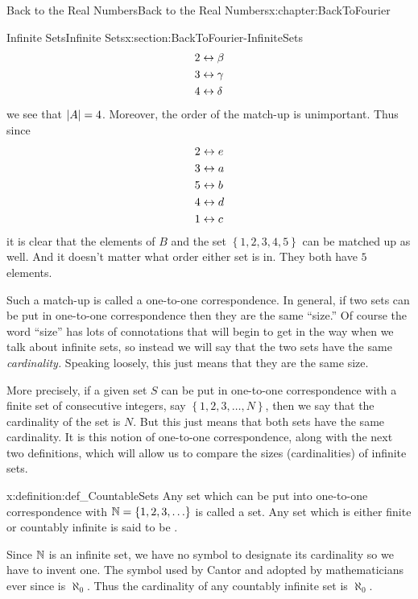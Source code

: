 \begin{chapterptx}{Back to the Real Numbers}{}{Back to the Real Numbers}{}{}{x:chapter:BackToFourier}
\begin{sectionptx}{Infinite Sets}{}{Infinite Sets}{}{}{x:section:BackToFourier-InfiniteSets}
\begin{align*}
			2& \leftrightarrow\beta\\
			3& \leftrightarrow\gamma\\
			4& \leftrightarrow\delta
		\end{align*}
		we see that \(\left|A\right|=4\). Moreover, the order of the match-up is unimportant. Thus since%
		\begin{align*}
			2& \leftrightarrow e\\
			3& \leftrightarrow a\\
			5& \leftrightarrow b\\
			4& \leftrightarrow d\\
			1& \leftrightarrow c
		\end{align*}
		it is clear that the elements of \(B\) and the set \(\left\{1,2,3,4,5\right\}\) can be matched up as well. And it doesn't matter what order either set is in. They both have \(5\) elements.%
		\par
		Such a match-up is called a one-to-one correspondence. In general, if two sets can be put in one-to-one correspondence then they are the same ``size.'' Of course the word ``size'' has lots of connotations that will begin to get in the way when we talk about infinite sets, so instead we will say that the two sets have the same \emph{cardinality.} Speaking loosely, this just means that they are the same size.%
		\par
		More precisely, if a given set \(S\) can be put in one-to-one correspondence with a finite set of consecutive integers, say \(\left\{1,2,3,\ldots, N\right\}\), then we say that the cardinality of the set is \(N\). But this just means that both sets have the same cardinality. It is this notion of one-to-one correspondence, along with the next two definitions, which will allow us to compare the sizes (cardinalities) of infinite sets.%
		\begin{definition}{}{x:definition:def_CountableSets}%
			 Any set which can be put into one-to-one correspondence with \(\mathbb {N}=\left\{1,2,3,\ldots\right\}\) is called a  set. Any set which is either finite or countably infinite is said to be .%
		\end{definition}
		Since \(\mathbb {N}\) is an infinite set, we have no symbol to designate its cardinality so we have to invent one. The symbol used by Cantor  and adopted by mathematicians ever since is \(\aleph_0\). Thus the cardinality of any countably infinite set is \(\aleph_0\).%

\end{sectionptx}
\end{chapterptx}
